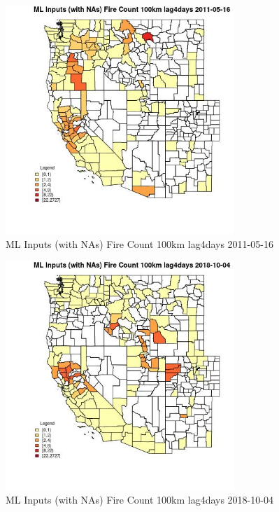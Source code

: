 \begin{figure} 
\centering  
\includegraphics[width=0.77\textwidth]{Code_Outputs/Report_ML_input_PM25_Step4_part_f_de_duplicated_aves_prioritize_24hr_obswNAs_CountyFire_Count_100km_lag4daysMean2011-05-16.jpg} 
\caption{\label{fig:Report_ML_input_PM25_Step4_part_f_de_duplicated_aves_prioritize_24hr_obswNAsCountyFire_Count_100km_lag4daysMean2011-05-16}ML Inputs (with NAs) Fire Count 100km lag4days 2011-05-16} 
\end{figure} 
 

\begin{figure} 
\centering  
\includegraphics[width=0.77\textwidth]{Code_Outputs/Report_ML_input_PM25_Step4_part_f_de_duplicated_aves_prioritize_24hr_obswNAs_CountyFire_Count_100km_lag4daysMean2018-10-04.jpg} 
\caption{\label{fig:Report_ML_input_PM25_Step4_part_f_de_duplicated_aves_prioritize_24hr_obswNAsCountyFire_Count_100km_lag4daysMean2018-10-04}ML Inputs (with NAs) Fire Count 100km lag4days 2018-10-04} 
\end{figure} 
 

